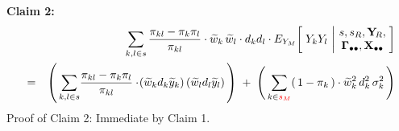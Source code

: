 \begin{enumerate}
    \vskip 0.3cm
    \noindent
    \textbf{Claim 2:}\quad
    \begin{eqnarray*}
    &&
        \underset{k,l \in s}{\sum}\,
        \dfrac{\pi_{kl} - \pi_{k}\pi_{l}}{\pi_{kl}}
        \cdot
        \widetilde{w}_{k}\,\widetilde{w}_{l}
        \cdot
        d_{k}d_{l}
        \cdot
        E_{Y_{M}}\!\left[\;
            Y_{k}Y_{l}
            \,\left\vert\!
            \begin{array}{c} s,s_{R},\mathbf{Y}_{\!R}, \\ \mathbf{\Gamma}_{\bullet\bullet},\mathbf{X}_{\bullet\bullet} \end{array}
            \right.
            \!\!\right]
    \\
    & = &
        \left(\,
            \underset{k,l \in s}{\sum}
            \dfrac{\pi_{kl} - \pi_{k}\pi_{l}}{\pi_{kl}}
            \cdot\!
            \left(\widetilde{w}_{k}d_{k}\widetilde{y}_{k}\right)
            \left(\widetilde{w}_{l}d_{l}\widetilde{y}_{l}\right)
            \,\right)
        \; + \;
        \left(\,
            \underset{k\in {\color{red}s_{M}}}{\sum}\!
            \left(\,1-\pi_{k}\,\right)
            \cdot
            \widetilde{w}_{k}^{2}\,d_{k}^{2}\,\sigma_{k}^{2}
            \,\right)
    \end{eqnarray*}
    Proof of Claim 2:\;\; Immediate by Claim 1.


\end{enumerate}
